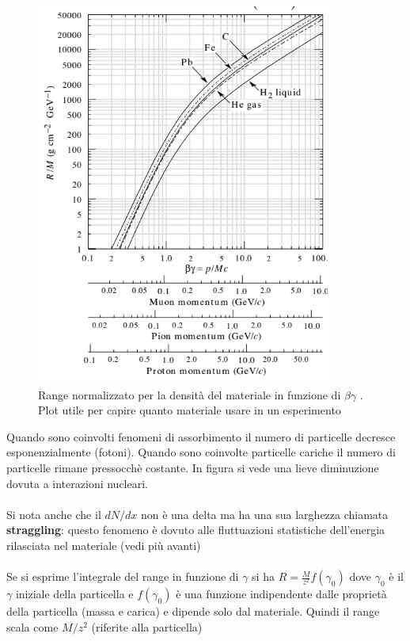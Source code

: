 \begin{minipage}{0.48\textwidth}
    \begin{figure}[H]
        \centering
        \includegraphics[width=\textwidth,frame]{Chapters/images/Interazione_radiazione_materia/image-20220216172742194.png}
        \captionsetup{width=\textwidth}
        \caption{Range normalizzato per la densità del materiale in funzione di $\beta \gamma$ . Plot utile per capire quanto materiale usare in un esperimento}
        \label{fig:}
    \end{figure}
\end{minipage} \hspace{1.cm}
\begin{minipage}{0.33\textwidth}
    Quando sono coinvolti fenomeni di assorbimento il numero di particelle decresce esponenzialmente (fotoni).
Quando sono coinvolte particelle cariche il numero di particelle rimane pressocchè costante. In figura si vede una lieve diminuzione dovuta a interazioni nucleari.
\\
\\
Si nota anche che il $dN/dx$ non è una delta ma ha una sua larghezza chiamata \textbf{straggling}: questo fenomeno è dovuto alle fluttuazioni statistiche dell'energia rilasciata nel materiale (vedi più avanti)
\\
\\
    Se si esprime l'integrale del range in funzione di $\gamma$ si ha $R=\frac{M}{z^2}f(\gamma_0)$ dove $\gamma_0$ è il $\gamma$ iniziale della particella e $f(\gamma_0)$ è una funzione indipendente dalle proprietà della particella (massa e carica) e dipende solo dal materiale. Quindi il range scala come $M/z^2$ (riferite alla particella)

\end{minipage}
